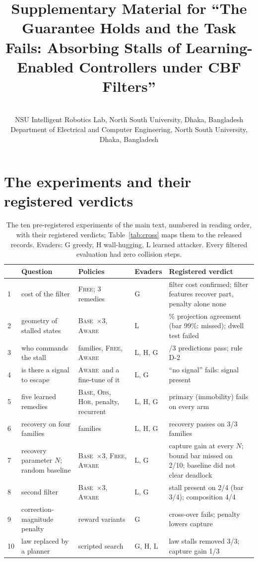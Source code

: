 \documentclass{l4dc2027}
\title[Safe and Stuck: Supplement]{Supplementary Material for ``The Guarantee Holds and the Task Fails: Absorbing Stalls of Learning-Enabled Controllers under CBF Filters''}
\author{%
 \Name{Mohammad Shoaib} \Email{[to confirm]}\\
 \addr NSU Intelligent Robotics Lab, North South University, Dhaka, Bangladesh
 \AND
 \Name{Shahnewaz Siddique} \Email{shahnewaz.siddique@northsouth.edu}\\
 \addr Department of Electrical and Computer Engineering, North South University, Dhaka, Bangladesh%
}
\newcommand{\Base}{\textsc{Base}}
\newcommand{\Obs}{\textsc{Obs}}
\newcommand{\Hor}{\textsc{Hor}}
\newcommand{\Free}{\textsc{Free}}
\newcommand{\Aware}{\textsc{Aware}}
\begin{document}
\maketitle

\section{The experiments and their registered verdicts}

\begin{table}[h]
\centering\scriptsize
\caption{The ten pre-registered experiments of the main text, numbered in reading order, with their registered verdicts; Table~\ref{tab:cross} maps them to the released records. Evaders: G greedy, H wall-hugging, L learned attacker. Every filtered evaluation had zero collision steps.}
\label{tab:rounds}\vspace{2pt}
\setlength{\tabcolsep}{3pt}
\begin{tabular}{@{}l >{\raggedright\arraybackslash}p{3.3cm} >{\raggedright\arraybackslash}p{3.3cm} l >{\raggedright\arraybackslash}p{5.3cm}@{}}
\toprule
& Question & Policies & Evaders & Registered verdict \\
\midrule
1 & cost of the filter & \Free; 3 remedies & G & filter cost confirmed; filter features recover part, penalty alone none \\
2 & geometry of stalled states & \Base\ $\times$3, \Aware & L & 98.1\% projection agreement (bar 99\%: missed); dwell test failed \\
3 & who commands the stall & 4 families, \Free, \Aware & L, H, G & 3/3 predictions pass; rule D-2 \\
4 & is there a signal to escape & \Aware\ and a fine-tune of it & L, G & ``no signal'' fails: signal present \\
5 & five learned remedies & \Base, \Obs, \Hor, penalty, recurrent & L, H, G & primary (immobility) fails on every arm \\
6 & recovery on four families & 4 families & L, H, G & recovery passes on 3/3 families \\
7 & recovery parameter $N$; random baseline & \Base\ $\times$3, \Free, \Aware & L, G & capture gain at every $N$; bound bar missed on 2/10; baseline did not clear deadlock \\
8 & second filter & \Base\ $\times$3, \Aware & L, G & stall present on 2/4 (bar 3/4); composition 4/4 \\
9 & correction-magnitude penalty & 3 reward variants & G & cross-over fails; penalty lowers capture \\
10 & law replaced by a planner & scripted search & G, H, L & law stalls removed 3/3; capture gain 1/3 \\
\bottomrule
\end{tabular}
\end{table}
\end{document}
